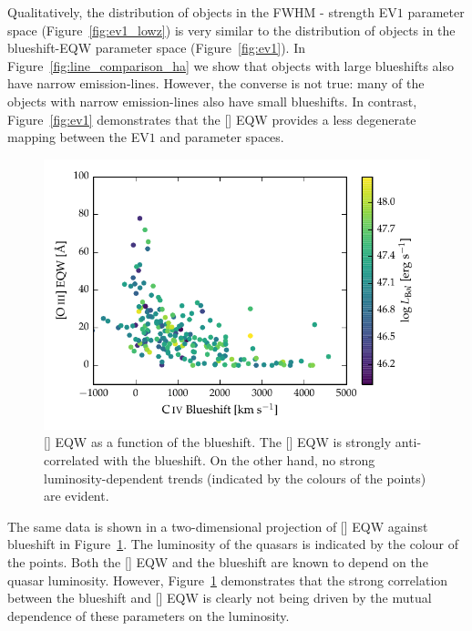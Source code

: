 Qualitatively, the distribution of objects in the \hb FWHM -  strength EV$1$ parameter space (Figure~\ref{fig:ev1_lowz}) is very similar to the distribution of objects in the  blueshift-EQW parameter space (Figure~\ref{fig:ev1}).
In Figure~\ref{fig:line_comparison_ha} we show that objects with large  blueshifts also have narrow \ha emission-lines.
However, the converse is not true: many of the objects with narrow \ha emission-lines also have small  blueshifts. 
In contrast, Figure~\ref{fig:ev1} demonstrates that the [] EQW provides a less degenerate mapping between the EV$1$ and  parameter spaces.

\begin{figure}
    \centering
    \includegraphics[width=\columnwidth]{figures/chapter04/civ_blueshift_oiii_eqw.pdf} 
    \caption[{[] EQW as a function of the  blueshift.}]{[] EQW as a function of the  blueshift. The [] EQW is strongly anti-correlated with the  blueshift. On the other hand, no strong luminosity-dependent trends (indicated by the colours of the points) are evident.}     
    \label{fig:civ_blueshift_oiii_eqw}
\end{figure}

The same data is shown in a two-dimensional projection of [] EQW against  blueshift in Figure~\ref{fig:civ_blueshift_oiii_eqw}. 
The luminosity of the quasars is indicated by the colour of the points. 
Both the [] EQW and the  blueshift are known to depend on the quasar luminosity. 
However, Figure~\ref{fig:civ_blueshift_oiii_eqw} demonstrates that the strong correlation between the  blueshift and [] EQW is clearly not being driven by the mutual dependence of these parameters on the luminosity. 

